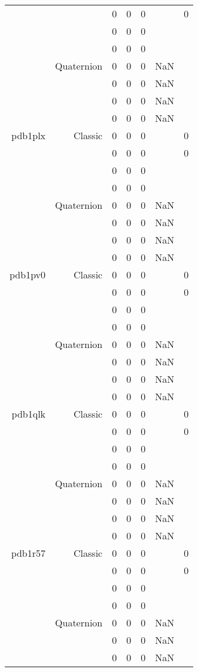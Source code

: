 \begin{xltabular}{\textwidth}{r|rcccSc}
& & 0 & 0 & 0 & & 0 \\
& & 0 & 0 & 0 & & \\
& & 0 & 0 & 0 & & \\
& Quaternion & 0 & 0 & 0 & NaN & \\
& & 0 & 0 & 0 & NaN & \\
& & 0 & 0 & 0 & NaN & \\
& & 0 & 0 & 0 & NaN & \\ \addlinespace
pdb1plx & Classic & 0 & 0 & 0 & & 0 \\
& & 0 & 0 & 0 & & 0 \\
& & 0 & 0 & 0 & & \\
& & 0 & 0 & 0 & & \\
& Quaternion & 0 & 0 & 0 & NaN & \\
& & 0 & 0 & 0 & NaN & \\
& & 0 & 0 & 0 & NaN & \\
& & 0 & 0 & 0 & NaN & \\ \addlinespace
pdb1pv0 & Classic & 0 & 0 & 0 & & 0 \\
& & 0 & 0 & 0 & & 0 \\
& & 0 & 0 & 0 & & \\
& & 0 & 0 & 0 & & \\
& Quaternion & 0 & 0 & 0 & NaN & \\
& & 0 & 0 & 0 & NaN & \\
& & 0 & 0 & 0 & NaN & \\
& & 0 & 0 & 0 & NaN & \\ \addlinespace
pdb1qlk & Classic & 0 & 0 & 0 & & 0 \\
& & 0 & 0 & 0 & & 0 \\
& & 0 & 0 & 0 & & \\
& & 0 & 0 & 0 & & \\
& Quaternion & 0 & 0 & 0 & NaN & \\
& & 0 & 0 & 0 & NaN & \\
& & 0 & 0 & 0 & NaN & \\
& & 0 & 0 & 0 & NaN & \\ \addlinespace
pdb1r57 & Classic & 0 & 0 & 0 & & 0 \\
& & 0 & 0 & 0 & & 0 \\
& & 0 & 0 & 0 & & \\
& & 0 & 0 & 0 & & \\
& Quaternion & 0 & 0 & 0 & NaN & \\
& & 0 & 0 & 0 & NaN & \\
& & 0 & 0 & 0 & NaN & \\

\end{xltabular}
